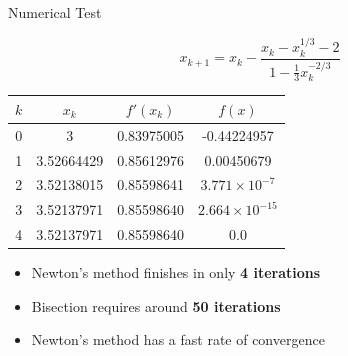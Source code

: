 \documentclass[10pt]{beamer}
\begin{document}
\begin{frame}{Numerical Test}

\begin{equation*}
    x_{k+1} = x_k - \frac{x_k - x_k^{1/3} - 2}{1 - \frac{1}{3}x_k^{-2/3}}
\end{equation*}

\begin{center}
  \small
    \renewcommand{\arraystretch}{1.3}
    \begin{tabular}{cccc}
    $k$ &    $x_k$     & $f'(x_k)$  &   $f(x)$                   \\ \hline
     0  &  3           & 0.83975005 & -0.44224957                \\
     1  &  3.52664429  & 0.85612976 &  0.00450679                \\
     2  &  3.52138015  & 0.85598641 &  $3.771\times 10^{-7}$   \\
     3  &  3.52137971  & 0.85598640 &  $2.664\times 10^{-15}$ \\
     4  &  3.52137971  & 0.85598640 &  0.0                       \\
    \end{tabular}
\end{center}

\begin{itemize}
    \item Newton's method finishes in only \textbf{4 iterations} 
    \item Bisection requires around \textbf{50 iterations}
    \item Newton's method has a fast rate of convergence
\end{itemize}
\end{frame}
\end{document}
